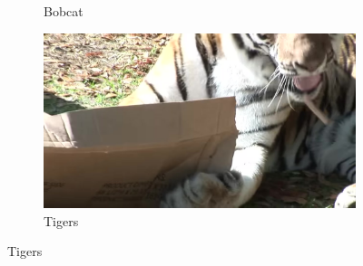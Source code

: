 \documentclass[12pt,a4paper]{article}
\begin{document}
\begin{figure}[h!]
\begin{subfigure}[b]{0.24\textwidth}
        \caption{Bobcat}
        \label{fig:bobcat}
    \end{subfigure}
    \hfill
    \begin{subfigure}[b]{0.24\textwidth}
        \includegraphics[width=\textwidth]{04_andre_arthur_tigers.jpg}
        \caption{Tigers}
        \label{fig:tigers}
    \end{subfigure}
    
    \vspace{1em} %
    

\end{figure}
\end{document}

